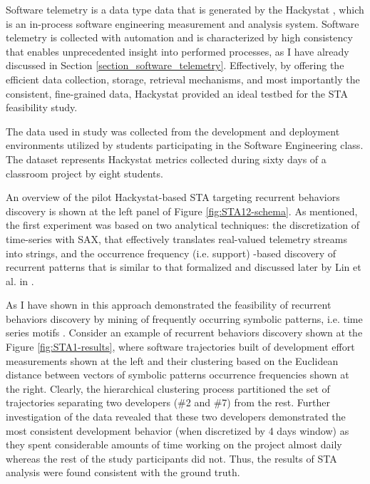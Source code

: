 Software telemetry is a data type data that is generated by the Hackystat \cite{citeulike:12929227}, which is an in-process software engineering measurement and analysis system. Software telemetry is collected with automation and is characterized by high consistency that enables unprecedented insight into performed processes, as I have already discussed in Section \ref{section_software_telemetry}. Effectively, by offering the efficient data collection, storage, retrieval mechanisms, and most importantly the consistent, fine-grained data, Hackystat provided an ideal testbed for the STA feasibility study.

The data used in study was collected from the development and deployment environments utilized by students participating in the Software Engineering class. The dataset represents Hackystat metrics collected during sixty days of a classroom project by eight students. 

An overview of the pilot Hackystat-based STA targeting recurrent behaviors discovery is shown at the left panel of Figure  \ref{fig:STA12-schema}. As mentioned, the first experiment was based on two analytical techniques: the discretization of time-series with SAX, that effectively translates real-valued telemetry streams into strings, and the occurrence frequency (i.e. support) -based discovery of recurrent patterns that is similar to that formalized and discussed later by Lin et al. in \cite{citeulike:10525778}. 

As I have shown in \cite{csdl2-10-09} this approach demonstrated the feasibility of recurrent behaviors discovery by mining of frequently occurring symbolic patterns, i.e. time series motifs \cite{sax}. Consider an example of recurrent behaviors discovery shown at the Figure \ref{fig:STA1-results}, where software trajectories built of development effort measurements shown at the left and their clustering based on the Euclidean distance between vectors of symbolic patterns occurrence frequencies shown at the right. Clearly, the hierarchical clustering process partitioned the set of trajectories separating two developers (\#2 and \#7) from the rest. Further investigation of the data revealed that these two developers demonstrated the most consistent development behavior (when discretized by 4 days window) as they spent considerable amounts of time working on the project almost daily whereas the rest of the study participants did not. Thus, the results of STA analysis were found consistent with the ground truth.

